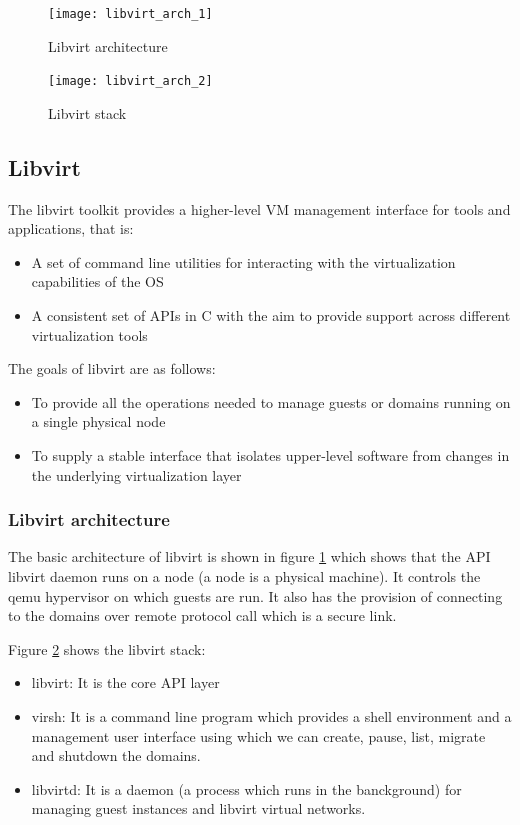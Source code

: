 \begin{figure}[h]
\begin{center}	
\texttt{[image: libvirt\_arch\_1]} 
\caption{Libvirt architecture}
\label{fig:libvirt_arch_1}
\end{center}
\end{figure}

\begin{figure}[h]
\begin{center}	
\texttt{[image: libvirt\_arch\_2]} 
\caption{Libvirt stack}
\label{fig:libvirt_arch_2}
\end{center}
\end{figure}



\subsection{Libvirt}
The libvirt toolkit provides a higher-level VM management interface for
tools and applications, that is:
\begin{itemize}
    \item A set of command line utilities for interacting with the virtualization capabilities of the OS
    \item A consistent set of APIs in C with the aim to provide support across different virtualization tools
\end{itemize}

The goals of libvirt are as follows:
\begin{itemize}
    \item To provide all the operations needed to manage guests or
    domains running on a single physical node
    \item To supply a stable interface that isolates upper-level software
    from changes in the underlying virtualization layer
\end{itemize}

\subsubsection{Libvirt architecture}
The basic architecture of libvirt is shown in figure \ref{fig:libvirt_arch_1} which shows that the API libvirt daemon runs on a node (a node is a physical machine). It controls the qemu hypervisor on which guests are run. It also has the provision of connecting to the domains over remote protocol call which is a secure link. 

Figure \ref{fig:libvirt_arch_2} shows the libvirt stack:
\begin{itemize}
    \item libvirt: It is the core API layer
    \item virsh: It is a command line program which provides a shell environment and a management user interface using which we can create, pause, list, migrate and shutdown the domains.
    \item libvirtd: It is a daemon (a process which runs in the banckground) for managing guest instances and libvirt virtual networks.
\end{itemize}

